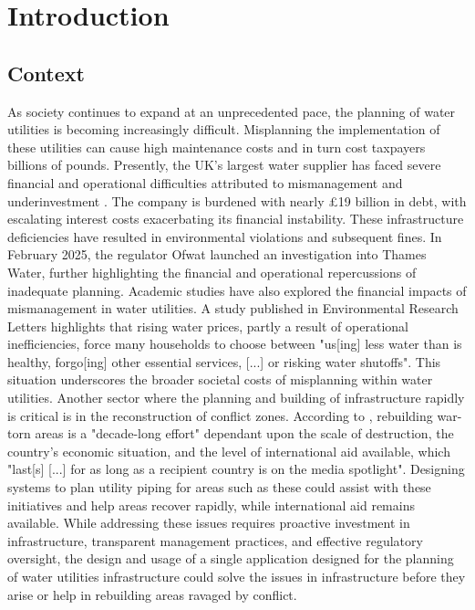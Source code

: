 
\chapter{Introduction}\label{Introduction}  %

\ifpdf
    \graphicspath{{Chapter1/Figs/Raster/}{Chapter1/Figs/PDF/}{Chapter1/Figs/}}
\else
    \graphicspath{{Chapter1/Figs/Vector/}{Chapter1/Figs/}}
\fi

\section{Context}
As society continues to expand at an unprecedented pace, the planning of water utilities is becoming increasingly difficult. Misplanning the implementation of these utilities can cause high maintenance costs and in turn cost taxpayers billions of pounds. Presently, the UK's largest water supplier has faced severe financial and operational difficulties attributed to mismanagement and underinvestment \citep{Jones2025}. The company is burdened with nearly £19 billion in debt, with escalating interest costs exacerbating its financial instability. These infrastructure deficiencies have resulted in environmental violations and subsequent fines. In February 2025, the regulator Ofwat launched an investigation into Thames Water, further highlighting the financial and operational repercussions of inadequate planning.\newline
Academic studies have also explored the financial impacts of mismanagement in water utilities. A study published in Environmental Research Letters \citep{Skerker2024} highlights that rising water prices, partly a result of operational inefficiencies, force many households to choose between "us[ing] less water than is healthy, forgo[ing] other essential services, [...] or risking water shutoffs". This situation underscores the broader societal costs of misplanning within water utilities.\newline
Another sector where the planning and building of infrastructure rapidly is critical is in the reconstruction of conflict zones. According to \cite{Tzifakis2013}, rebuilding war-torn areas is a "decade-long effort" dependant upon the scale of destruction, the country's economic situation, and the level of international aid available, which "last[s] [...] for as long as a recipient country is on the media spotlight". Designing systems to plan utility piping for areas such as these could assist with these initiatives and help areas recover rapidly, while international aid remains available. While addressing these issues requires proactive investment in infrastructure, transparent management practices, and effective regulatory oversight, the design and usage of a single application designed for the planning of water utilities infrastructure could solve the issues in infrastructure before they arise or help in rebuilding areas ravaged by conflict.\newline
